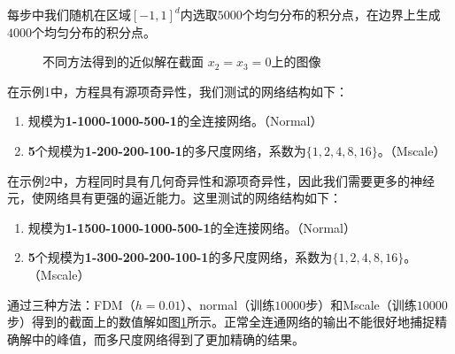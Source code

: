 每步中我们随机在区域$[-1, 1]^d$内选取$5000$个均匀分布的积分点，在边界上生成$4000$个均匀分布的积分点。

\begin{figure}[htbp]
\centering
{}
\caption{不同方法得到的近似解在截面 $x_2 = x_3 = 0$上的图像}
\label{ens}
\end{figure}

在示例1中，方程具有源项奇异性，我们测试的网络结构如下：
\begin{enumerate}
\item 规模为\textbf{1-1000-1000-500-1}的全连接网络。（Normal）
\item \textbf{5}个规模为\textbf{1-200-200-100-1}的多尺度网络，系数为$\{1,2,4,8,16\}$。（Mscale）
\end{enumerate}

在示例2中，方程同时具有几何奇异性和源项奇异性，因此我们需要更多的神经元，使网络具有更强的逼近能力。这里测试的网络结构如下：
\begin{enumerate}
\item 规模为\textbf{1-1500-1000-1000-500-1}的全连接网络。（Normal）
\item \textbf{5}个规模为\textbf{1-300-200-200-100-1}的多尺度网络，系数为$\{1,2,4,8,16\}$。（Mscale）
\end{enumerate}

通过三种方法：FDM（$h=0.01$）、normal（训练$10000$步）和Mscale（训练$10000$步）得到的截面上的数值解如图\ref{ens}所示。正常全连通网络的输出不能很好地捕捉精确解中的峰值，而多尺度网络得到了更加精确的结果。
